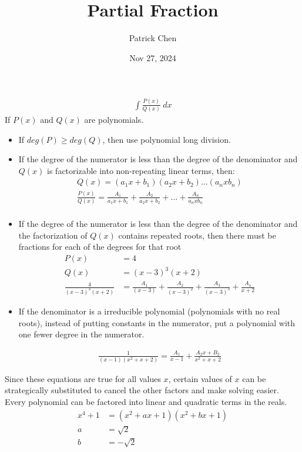 \documentclass{article}
\title{Partial Fraction}
\author{Patrick Chen}
\date{ Nov 27, 2024}
\theoremstyle{mytheoremstyle}
\theoremstyle{mytheoremstyle}
\theoremstyle{myproblemstyle}
\begin{document}
    \maketitle
    \begin{align*}
        \int \frac{P(x)}{Q(x)} \ dx
    \end{align*}
    If $P(x)$ and $Q(x)$ are polynomials.

    \begin{itemize}
        \item If $deg(P)\ge deg(Q)$, then use polynomial long division.
        \item If the degree of the numerator is less than the degree of the
            denominator and $Q(x)$ is factorizable into non-repeating linear
            terms, then:
            \begin{align*}
                Q(x) = (a_1x+b_1)(a_2x+b_2)\dots(a_nxb_n) \\
                \frac{P(x)}{Q(x)} = \frac{A_1}{a_1x+b_1} + \frac{A_2}{a_2x+b_2}+\dots+\frac{A_n}{a_nxb_n} \\
            \end{align*}
        \item If the degree of the numerator is less than the degree of the
            denominator and the factorization of $Q(x)$ contains repeated roots,
            then there must be fractions for each of the degrees for that root
            \begin{align*}
                P(x) &= 4 \\
                Q(x) &= (x-3)^3(x+2) \\
                \frac{4}{(x-3)^3(x+2)}
                &= \frac{A_1}{(x-3)} + \frac{A_2}{(x-3)^2} + \frac{A_3}{(x-3)^3} + \frac{A_4}{x+2}
            \end{align*}
        \item If the denominator is a irreducible polynomial (polynomials with
            no real roots), instead of putting constants in the numerator, put a
            polynomial with one fewer degree in the numerator.

            \begin{align*}
                \frac{1}{(x-1)(x^2+x+2)} = \frac{A_1}{x-1} + \frac{A_2x+B_2}{x^2+x+2}
            \end{align*}
    \end{itemize}

    Since these equations are true for all values $x$, certain values of $x$ can
    be strategically substituted to cancel the other factors and make solving
    easier. Every polynomial can be factored into linear and quadratic terms in
    the reals.
    \begin{align*}
        x^4 + 1 &= (x^2 + ax + 1) (x^2 + bx + 1) \\
        a &= \sqrt{2} \\
        b &= -\sqrt{2}
    \end{align*}
\end{document}
